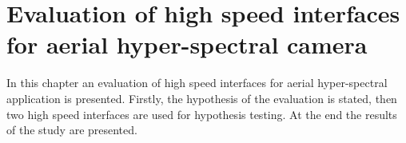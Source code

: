 \chapter{Evaluation of high speed interfaces for aerial hyper-spectral camera}


In this chapter an evaluation of high speed interfaces for aerial hyper-spectral application is presented. Firstly, the hypothesis of the evaluation is stated, then two high speed interfaces are used for hypothesis testing. At the end the results of the study are presented. 